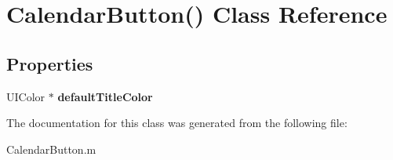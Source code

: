 \hypertarget{interface_calendar_button_07_08}{\section{\-Calendar\-Button() \-Class \-Reference}
\label{interface_calendar_button_07_08}
}
\subsection*{\-Properties}
\begin{DoxyCompactItemize}
\item 
\hypertarget{interface_calendar_button_07_08_a1db2007a9764b64e2994752bc7f94347}{\-U\-I\-Color $\ast$ {\bfseries default\-Title\-Color}}\label{interface_calendar_button_07_08_a1db2007a9764b64e2994752bc7f94347}

\end{DoxyCompactItemize}


\-The documentation for this class was generated from the following file\-:\begin{DoxyCompactItemize}
\item 
\-Calendar\-Button.\-m\end{DoxyCompactItemize}
